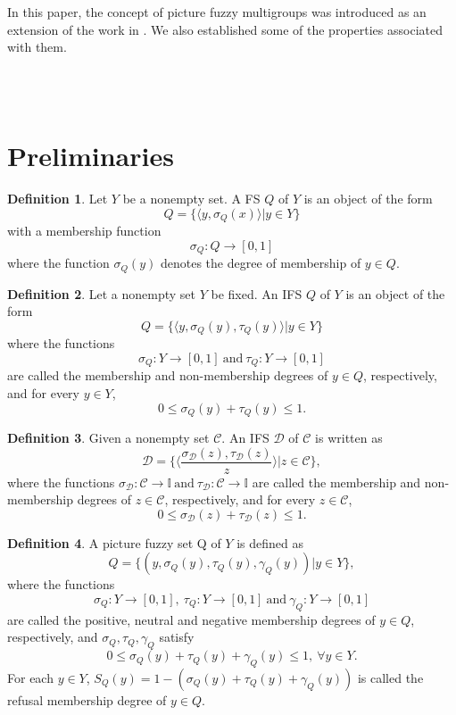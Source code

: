 \documentclass[12pt,letterpaper]{amsart}
\theoremstyle{plain}
\theoremstyle{definition}
\newtheorem{definition}{Definition}[section]
\numberwithin{equation}{section}
\begin{document}
In this paper, the concept of picture fuzzy multigroups was introduced as an extension of the work in \cite{s2}. We also established some of the properties associated with them. 


\ \\ \ \\

\section{Preliminaries}
\begin{definition} \cite{z}
Let $Y$ be a nonempty set. A FS $Q$ of $Y$ is an object of the form $$Q = \lbrace \langle y, \sigma_{Q}(x) \rangle | y \in Y \rbrace$$  with a membership function $$\sigma_{Q} : Q \longrightarrow [0, 1]$$ where the function $\sigma_{Q}(y)$ denotes the degree of membership of $y \in Q.$
\end{definition}

\begin{definition} \cite{a1}
Let a nonempty set $Y$ be fixed. An IFS $Q$ of $Y$ is an object of the form $$Q = \lbrace \langle y, \sigma_{Q}(y), \tau_{Q}(y) \rangle | y \in Y \rbrace$$ where the functions $$\sigma_{Q}: Y \rightarrow [0, 1]~\text{and}~ \tau_{Q}: Y \rightarrow [0, 1]$$ are called the membership and non-membership degrees of $y \in Q$, respectively, and for every $y \in Y$, $$0 \leq \sigma_{Q}(y) + \tau_{Q}(y) \leq 1.$$
\end{definition}

\begin{definition} \cite{a1}
Given a nonempty set $\mathcal{C}.$  An IFS $\mathcal{D}$ of $\mathcal{C}$ is written as $$\mathcal{D} = \lbrace \langle \dfrac{\sigma_{\mathcal{D}}(z), \tau_{\mathcal{D}}(z)}{z} \rangle | z \in \mathcal{C} \rbrace,$$
where the functions $\sigma_{\mathcal{D}}: \mathcal{C} \rightarrow \mathbb{I}~\text{and}~ \tau_{\mathcal{D}}: \mathcal{C} \rightarrow \mathbb{I}$ are called the membership and non-membership degrees of $z \in \mathcal{C}$, respectively, and for every $z \in \mathcal{C}$, $$0 \leq \sigma_{\mathcal{D}}(z) + \tau_{\mathcal{D}}(z) \leq 1.$$
\end{definition}

\begin{definition} \cite{ck}
A picture fuzzy set Q of $Y$ is defined as $$Q = \lbrace (y, \sigma_{Q}(y), \tau_{Q}(y), \gamma_{Q}(y))| y \in Y \rbrace,$$ where the functions $$\sigma_{Q}: Y \rightarrow [0, 1],~ \tau_{Q}: Y \rightarrow [0, 1]~ \text{and}~ \gamma_{Q}: Y \rightarrow [0, 1]$$
are called the positive, neutral and negative membership degrees of $y \in Q$, respectively, and $\sigma_{Q}, \tau_{Q}, \gamma_{Q}$ satisfy $$0 \leq \sigma_{Q}(y) + \tau_{Q}(y) + \gamma_{Q}(y) \leq 1,~ \forall y \in Y.$$ For each $y \in Y$, $S_{Q}(y) = 1 - (\sigma_{Q}(y) + \tau_{Q}(y) + \gamma_{Q}(y))$ is called the refusal membership degree of $y \in Q$.
\end{definition}
\end{document}
